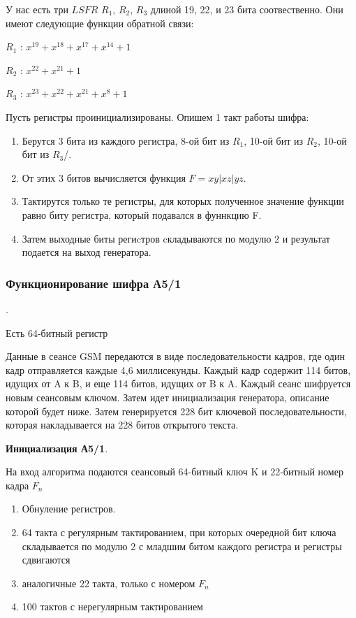 \documentclass[colorthm]{./civarticle}
\begin{document}
У нас есть три $LSFR$ $R_1$, $R_2$, $R_3$ длиной 19, 22, и 23 бита соотвественно. Они имеют следующие функции обратной связи:

$R_1$ : $x^{19} + x^{18} + x^{17} + x^{14} + 1$

$R_2$ : $x^{22} + x^{21} + 1$

$R_3$ : $x^{23} + x^{22} + x^{21} + x^{8} + 1$

Пусть регистры проинициализированы. Опишем 1 такт работы шифра:

\begin{enumerate}
        \item Берутся 3 бита из каждого регистра, 8-ой бит из $R_1$, 10-ой бит из $R_2$, 10-ой бит из $R_3$/.
        \item От этих 3 битов вычисляется функция $F=xy|xz|yz$.
        \item Тактирутся только те регистры, для которых полученное значение функции равно биту регистра, который подавался в фуннкцию F.
        \item Затем выходные биты региcтров cкладываются по модулю 2 и результат подается на выход генератора.
\end{enumerate}

\subsubsection{Функционирование шифра А5/1}.

Есть 64-битный регистр 

Данные в сеансе GSM передаются в виде последовательности кадров, где один кадр отправляется каждые 4,6 миллисекунды. Каждый кадр содержит 114 битов, идущих от A к B, и еще 114 битов, идущих от B к A. Каждый сеанс шифруется новым сеансовым ключом. Затем идет инициализация генератора, описание которой будет ниже. Затем генерируется 228 бит ключевой последовательности, которая накладывается на 228 битов открытого текста.

\textbf{Инициализация А5/1}.

На вход алгоритма подаются сеансовый 64-битный ключ K и 22-битный номер кадра $F_n$

\begin{enumerate}
        \item Обнуление регистров.
        \item 64 такта с регулярным тактированием, при которых очередной бит ключа складывается по модулю 2 с младшим битом каждого регистра и регистры сдвигаются
        \item аналогичные 22 такта, только с номером $F_n$
        \item 100 тактов с нерегулярным тактированием
\end{enumerate}
\end{document}
